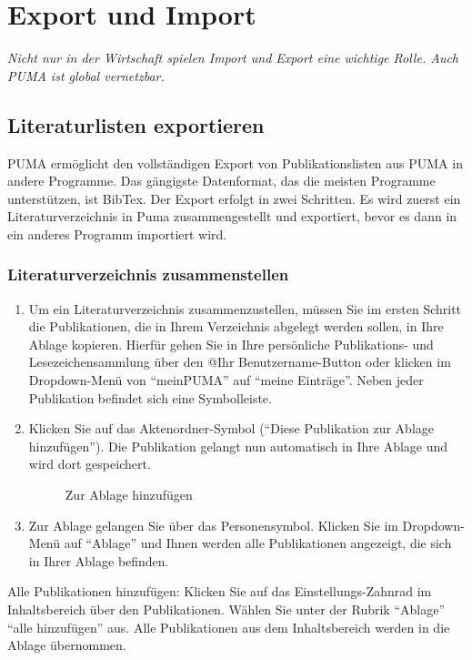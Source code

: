 \chapter{Export und Import}
\label{ch:exportImport}
\textit{Nicht nur in der Wirtschaft spielen Import und Export eine wichtige Rolle. Auch PUMA ist global vernetzbar.}
\section{Literaturlisten exportieren}
\label{sec:llExportieren}
PUMA ermöglicht den vollständigen Export von Publikationslisten aus PUMA in andere Programme. Das gängigste Datenformat, das die meisten Programme unterstützen, ist BibTex. \newline 
Der Export erfolgt in zwei Schritten. Es wird zuerst ein Literaturverzeichnis in Puma zusammengestellt und exportiert, bevor es dann in ein anderes Programm importiert wird.
\subsection{Literaturverzeichnis zusammenstellen}
\label{subsec:lvZusammenstellen}
\begin{enumerate}
    \item Um ein Literaturverzeichnis zusammenzustellen, müssen Sie im ersten Schritt die Publikationen, die in Ihrem Verzeichnis abgelegt werden sollen, in Ihre Ablage kopieren. Hierfür gehen Sie in Ihre persönliche Publikations- und Lesezeichensammlung über den @Ihr Benutzername-Button oder klicken im Dropdown-Menü von \enquote{meinPUMA} auf \enquote{meine Einträge}.  Neben jeder Publikation befindet sich eine Symbolleiste.
    \item Klicken Sie auf das Aktenordner-Symbol (\enquote{Diese Publikation zur Ablage hinzufügen}). Die Publikation gelangt nun automatisch in Ihre Ablage und wird dort gespeichert.
\begin{figure}[h!]
 \centering
 \caption{Zur Ablage hinzufügen}
 \label{fig:zurAblageHinzu}
\end{figure}
    \item Zur Ablage gelangen Sie über das Personensymbol. Klicken Sie im Dropdown-Menü auf \enquote{Ablage} und Ihnen werden alle Publikationen angezeigt, die sich in Ihrer Ablage befinden. 
\end{enumerate} 
Alle Publikationen hinzufügen: Klicken Sie auf das Einstellungs-Zahnrad im Inhaltsbereich über den Publikationen. Wählen Sie unter der Rubrik \enquote{Ablage} \enquote{alle hinzufügen} aus. Alle Publikationen aus dem Inhaltsbereich werden in die Ablage übernommen. 
